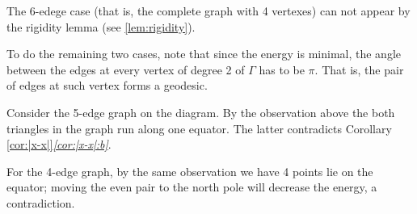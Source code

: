 The 6-edege case (that is, the complete graph with 4 vertexes) can not appear by the rigidity lemma (see \ref{lem:rigidity}).

To do the remaining two cases, note that since the energy is minimal, the angle between the edges at every vertex of degree 2 of $\Gamma$ has to be $\pi$. 
That is, the pair of edges at such vertex forms a geodesic.

Consider the 5-edge graph on the diagram.
By the observation above the both triangles in the graph run along one equator.
The latter contradicts Corollary \ref{cor:|x-x|}\textit{\ref{cor:|x-x|:b}}.

For the 4-edge graph,
by the same observation we have 4 points lie on the equator; 
moving the even pair to the north pole will decrease the energy, a contradiction.
\qeds
